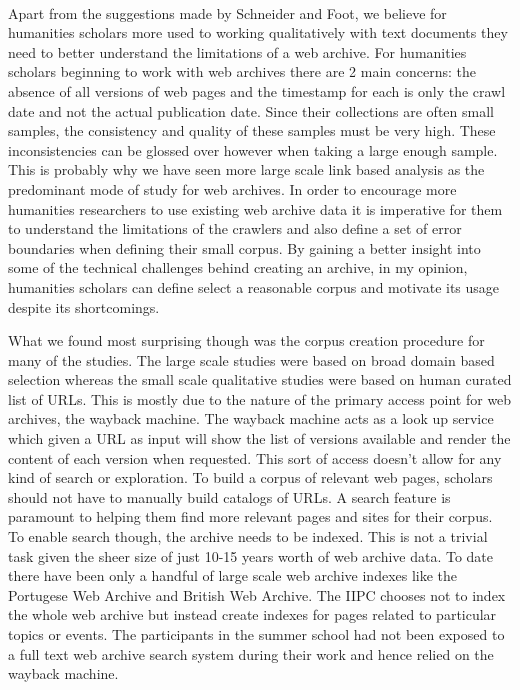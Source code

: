 \paragraph{} %
\label{par:}
Apart from the suggestions made by Schneider and Foot, we believe for humanities scholars more used to working qualitatively with text documents they need to better understand the limitations of a web archive. For humanities scholars beginning to work with web archives there are 2 main concerns: the absence of all versions of web pages and the timestamp for each is only the crawl date and not the actual publication date. Since their collections are often small samples, the consistency and quality of these samples must be very high. These inconsistencies can be glossed over however when taking a large enough sample. This is probably why we have seen more large scale link based analysis as the predominant mode of study for web archives. In order to encourage more humanities researchers to use existing web archive data it is imperative for them to understand the limitations of the crawlers and also define a set of error boundaries when defining their small corpus. By gaining a better insight into some of the technical challenges behind creating an archive, in my opinion, humanities scholars can define select a reasonable corpus and motivate its usage despite its shortcomings. 

What we found most surprising though was the corpus creation procedure for many of the studies. The large scale studies were based on broad domain based selection whereas the small scale qualitative studies were based on human curated list of URLs. This is mostly due to the nature of the primary access point for web archives, the wayback machine. The wayback machine acts as a look up service which given a URL as input will show the list of versions available and render the content of each version when requested. This sort of access doesn't allow for any kind of search or exploration. To build a corpus of relevant web pages, scholars should not have to manually build catalogs of URLs. A search feature is paramount to helping them find more relevant pages and sites for their corpus. To enable search though, the archive needs to be indexed. This is not a trivial task given the sheer size of just 10-15 years worth of web archive data. To date there have been only a handful of large scale web archive indexes like the Portugese Web Archive and British Web Archive. The IIPC chooses not to index the whole web archive but instead create indexes for pages related to particular topics or events. The participants in the summer school had not been exposed to a full text web archive search system during their work and hence relied on the wayback machine.

